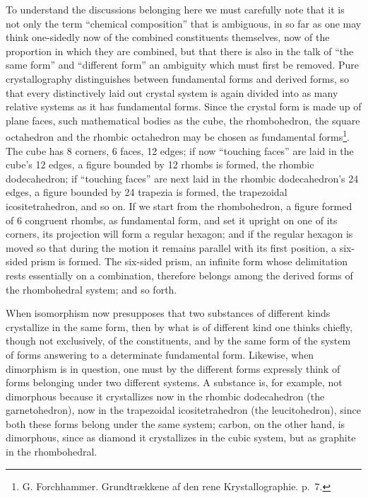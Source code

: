 \documentclass[12pt,a4paper]{book}
\begin{document}
To understand the discussions belonging here we must carefully note that it is
not only the term ``chemical
\setcounter{footnote}{0}
composition'' that is ambiguous, in so far as one may think one-sidedly now of
the combined constituents themselves, now of the proportion in which they are
combined, but that there is also in the talk of ``the same form'' and
``different form'' an ambiguity which must first be removed. Pure
crystallography distinguishes between fundamental forms and derived forms, so
that every distinctively laid out crystal system is again divided into as many
relative systems as it has fundamental forms. Since the crystal form is made up
of plane faces, such mathematical bodies as the cube, the rhombohedron, the
square octahedron and the rhombic octahedron may be chosen as fundamental
forms\footnote{G. Forchhammer. Grundtrækkene af den rene Krystallographie.
p.~7.}. The cube has 8 corners, 6 faces, 12 edges; if now ``touching faces''
are laid in the cube's 12 edges, a figure bounded by 12 rhombs is formed, the
rhombic dodecahedron; if ``touching faces'' are next laid in the rhombic
dodecahedron's 24 edges, a figure bounded by 24 trapezia is formed, the
trapezoidal icositetrahedron, and so on. If we start from the rhombohedron, a
figure formed of 6 congruent rhombs, as fundamental form, and set it upright on
one of its corners, its projection will form a regular hexagon; and if the
regular hexagon is moved so that during the motion it remains parallel with its
first position, a six-sided prism is formed. The six-sided prism, an infinite
form whose delimitation rests essentially on a combination, therefore belongs
among the derived forms of the rhombohedral system; and so forth.

When isomorphism now presupposes that two substances of different kinds
crystallize in the same form, then by what is of different kind one thinks
chiefly, though not exclusively, of the constituents, and by the same form of
the system of forms answering to a determinate fundamental form. Likewise, when
dimorphism is in question, one must by the different forms expressly think of
forms belonging under two different
\setcounter{footnote}{0}
systems. A substance is, for example, not dimorphous because it crystallizes
now in the rhombic dodecahedron (the garnetohedron), now in the trapezoidal
icositetrahedron (the leucitohedron), since both these forms belong under the
same system; carbon, on the other hand, is dimorphous, since as diamond it
crystallizes in the cubic system, but as graphite in the rhombohedral.
\end{document}

